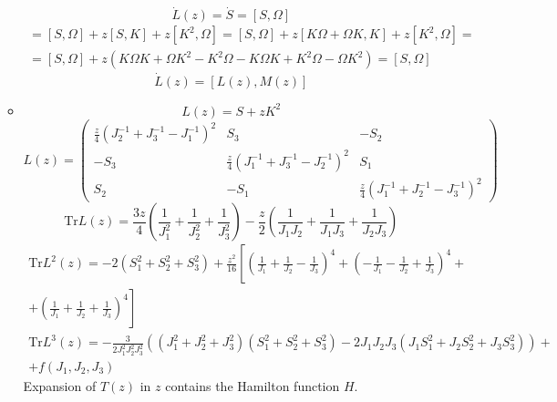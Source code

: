 \documentclass[12pt]{article}
\theoremstyle{definition}
\begin{document}
\begin{enumerate}
\begin{itemize}
        \begin{equation}
            \dot{L}(z)=\dot{S}=[S,\Omega]
        \end{equation}
        \begin{multline}
            [L(z),M(z)]=[S,\Omega]+z[S,K]+z[K^2,\Omega]=[S,\Omega]+z[K\Omega+\Omega K,K]+z[K^2,\Omega]=\\=[S,\Omega]+z(K\Omega K+\Omega K^2-K^2\Omega-K\Omega K+K^2\Omega-\Omega K^2)=[S,\Omega]
        \end{multline}
        \begin{equation}
            \boxed{\dot{L}(z)=[L(z),M(z)]}
        \end{equation}
        \item
        \begin{equation}
            L(z)=S+zK^2
        \end{equation}
        \begin{equation}
            L(z)=\begin{pmatrix}
                \frac{z}{4}(J_2^{-1}+J_3^{-1}-J_1^{-1})^2 & S_3 & -S_2\\
                -S_3 & \frac{z}{4}(J_1^{-1}+J_3^{-1}-J_2^{-1})^2 & S_1\\
                S_2 & -S_1 & \frac{z}{4}(J_1^{-1}+J_2^{-1}-J_3^{-1})^2
            \end{pmatrix}
        \end{equation}
        \begin{equation}
            \text{Tr}L(z)=\frac{3z}{4}\left(\frac{1}{J^2_1}+\frac{1}{J^2_2}+\frac{1}{J^2_3}\right)-\frac{z}{2}\left(\frac{1}{J_1J_2}+\frac{1}{J_1J_3}+\frac{1}{J_2J_3}\right)
        \end{equation}
        \begin{multline}
            \text{Tr}L^2(z)=-2(S_1^2+S_2^2+S_3^2)+\frac{z^2}{16}\left[\left(\frac{1}{J_1}+\frac{1}{J_2}-\frac{1}{J_3}\right)^4+\left(-\frac{1}{J_1}-\frac{1}{J_2}+\frac{1}{J_3}\right)^4+\right.\\\left.+\left(\frac{1}{J_1}+\frac{1}{J_2}+\frac{1}{J_3}\right)^4\right]
        \end{multline}
        \begin{multline}
            \text{Tr}L^3(z)=-\frac{3}{2J_1^2J_2^2J_3^2}((J_1^2+J_2^2+J_3^2)(S_1^2+S_2^2+S_3^2)-2J_1J_2J_3(J_1S_1^2+J_2S_2^2+J_3S_3^2))+\\+f(J_1,J_2,J_3)
        \end{multline}
        Expansion of $T(z)$ in $z$ contains the Hamilton function $H$.
    \end{itemize}

\end{enumerate}
\end{document}

